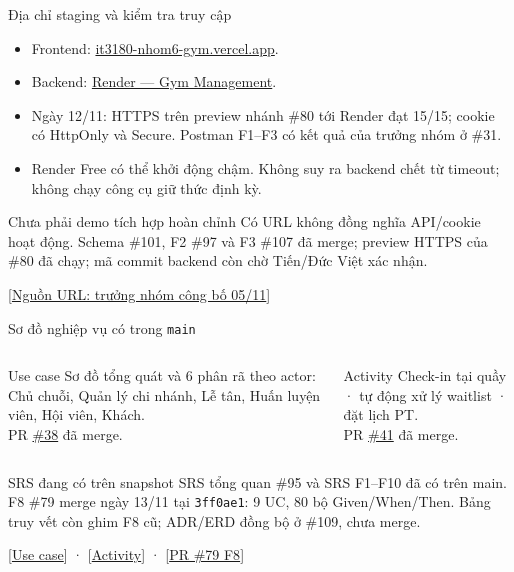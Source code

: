 \documentclass[aspectratio=169,10pt]{beamer}
\begin{document}
\begin{frame}{Địa chỉ staging và kiểm tra truy cập}
  \begin{itemize}
    \item Frontend: \href{https://it3180-nhom6-gym.vercel.app}{it3180-nhom6-gym.vercel.app}.
    \item Backend: \href{https://it3180-nhom6-gym-management.onrender.com}{Render — Gym Management}.
    \item Ngày 12/11: HTTPS trên preview nhánh \#80 tới Render đạt 15/15; cookie có HttpOnly và Secure. Postman F1--F3 có kết quả của trưởng nhóm ở \#31.
    \item Render Free có thể khởi động chậm. Không suy ra backend chết từ timeout; không chạy công cụ giữ thức định kỳ.
  \end{itemize}
  \begin{alertblock}{Chưa phải demo tích hợp hoàn chỉnh}
    Có URL không đồng nghĩa API/cookie hoạt động. Schema \#101, F2 \#97 và F3 \#107 đã merge; preview HTTPS của \#80 đã chạy; mã commit backend còn chờ Tiến/Đức Việt xác nhận.
  \end{alertblock}
  \scriptsize [\href{https://github.com/Ktin06/it3180_nhom6_gym_management/issues/31\#issuecomment-6653959733}{Nguồn URL: trưởng nhóm công bố 05/11}]
\end{frame}

\begin{frame}{Sơ đồ nghiệp vụ có trong \texttt{main}}
  \begin{columns}[T,onlytextwidth]
      \begin{block}{Use case}
        Sơ đồ tổng quát và 6 phân rã theo actor: Chủ chuỗi, Quản lý chi nhánh, Lễ tân, Huấn luyện viên, Hội viên, Khách.\\[.5em]
        PR \href{https://github.com/Ktin06/it3180_nhom6_gym_management/pull/38}{\#38} đã merge.
      \end{block}
      \begin{block}{Activity}
        Check-in tại quầy · tự động xử lý waitlist · đặt lịch PT.\\[.5em]
        PR \href{https://github.com/Ktin06/it3180_nhom6_gym_management/pull/41}{\#41} đã merge.
      \end{block}
  \end{columns}
  \begin{block}{SRS đang có trên snapshot}
    SRS tổng quan \#95 và SRS F1--F10 đã có trên main. F8 \#79 merge ngày 13/11 tại \texttt{3ff0ae1}: 9 UC, 80 bộ Given/When/Then. Bảng truy vết còn ghim F8 cũ; ADR/ERD đồng bộ ở \#109, chưa merge.
  \end{block}
  \scriptsize [\href{https://github.com/Ktin06/it3180_nhom6_gym_management/tree/main/docs/design/use-case}{Use case}] · [\href{https://github.com/Ktin06/it3180_nhom6_gym_management/tree/main/docs/design/activity}{Activity}] · [\href{https://github.com/Ktin06/it3180_nhom6_gym_management/pull/79}{PR \#79 F8}]
\end{frame}
\end{document}
